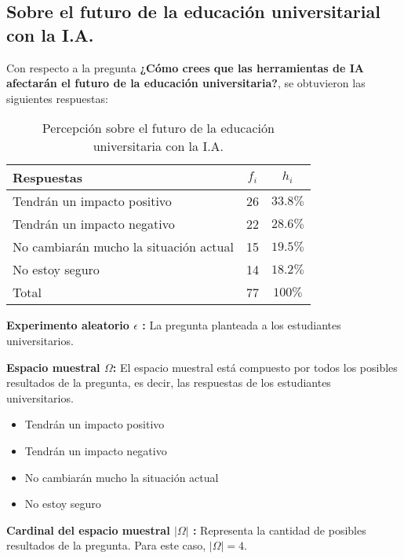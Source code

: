 \subsection{Sobre el futuro de la educación universitarial con la I.A.}

Con respecto a la pregunta \textbf{¿Cómo crees que las herramientas de IA afectarán el futuro de la educación universitaria?}, se obtuvieron las siguientes respuestas:


\begin{table}[H]
  \centering
  \renewcommand{\arraystretch}{1.5}
  \begin{tabular}{l c c }
    \hline
    Respuestas & \(f_i\) & \(h_i\) \\
    \hline
    Tendrán un impacto positivo & 26 & \(33.8\%\) \\
    Tendrán un impacto negativo & 22 & \(28.6\%\) \\
    No cambiarán mucho la situación actual & 15 & \(19.5\%\) \\
    No estoy seguro & 14 & \(18.2\%\) \\
    \hline
    Total & 77 & \(100\%\) \\
  \end{tabular}
  \caption{Percepción sobre el futuro de la educación universitaria con la I.A.}
  \label{tabla:futuroIA}
\end{table}
\vspace{-0.8cm}
\textbf{Experimento aleatorio \(\epsilon\) :} La pregunta planteada a los estudiantes universitarios.

\textbf{Espacio muestral \(\Omega\):} El espacio muestral está compuesto por todos los posibles resultados de la pregunta, es decir, las respuestas de los estudiantes universitarios.

\begin{itemize}
  \item Tendrán un impacto positivo
  \item Tendrán un impacto negativo
  \item No cambiarán mucho la situación actual
  \item No estoy seguro
\end{itemize}
\vspace{-0.5cm}
\textbf{Cardinal del espacio muestral $|\Omega|$ :} Representa la cantidad de posibles resultados de la pregunta. Para este caso, \(|\Omega| = 4\).

